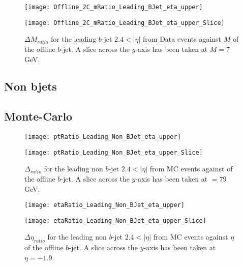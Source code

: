 		\begin{figure}[h]
			\centering
			
			\begin{minipage}[h]{0.33\linewidth}
				\texttt{[image: Offline\_2C\_mRatio\_Leading\_BJet\_eta\_upper]}
			\end{minipage}
			\quad
			\begin{minipage}[h]{0.33\linewidth}
				\texttt{[image: Offline\_2C\_mRatio\_Leading\_BJet\_eta\_upper\_Slice]}
			\end{minipage}
			\caption{$\Delta M_{ratio}$ for the leading \pt $b$-jet $2.4 < |\eta|$ from Data events against $M$ of the offline $b$-jet. A slice across the $y$-axis has been taken at $M=7$GeV. }
			\label{fig:D:leadingbmforward}
		\end{figure}

\newpage
		\subsection{Non bjets}

		\subsection{Monte-Carlo}

		\begin{figure}[h]
			\centering
			\begin{minipage}[h]{0.33\linewidth}
				\texttt{[image: ptRatio\_Leading\_Non\_BJet\_eta\_upper]}

			\end{minipage}
			\quad
			\begin{minipage}[h]{0.33\linewidth}
				\texttt{[image: ptRatio\_Leading\_Non\_BJet\_eta\_upper\_Slice]}
			\end{minipage}
			\caption{$\Delta $\pt$_{ratio}$ for the leading \pt non $b$-jet $2.4 < |\eta|$ from MC events against \pt of the offline $b$-jet. A slice across the $y$-axis has been taken at \pt$=79$GeV. }
			\label{fig:MC:leadingnonbptforward}
		\end{figure}

		\begin{figure}[h]
			\centering

			\begin{minipage}[h]{0.33\linewidth}
				\texttt{[image: etaRatio\_Leading\_Non\_BJet\_eta\_upper]}
			\end{minipage}
			\quad
			\begin{minipage}[h]{0.33\linewidth}
				\texttt{[image: etaRatio\_Leading\_Non\_BJet\_eta\_upper\_Slice]}
			\end{minipage}
			\caption{$\Delta \eta_{ratio}$ for the leading \pt non $b$-jet $2.4 < |\eta|$ from MC events against $\eta$ of the offline $b$-jet. A slice across the $y$-axis has been taken at $\eta=-1.9$. }
			\label{fig:MC:leadingnonbetaforward}
		\end{figure}

